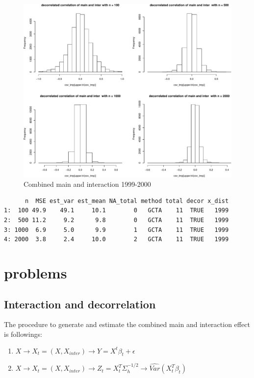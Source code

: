 \documentclass[]{article}
\providecommand{\tightlist}{%
  \setlength{\itemsep}{0pt}\setlength{\parskip}{0pt}}
\begin{document}
\begin{figure}
\centering
\includegraphics{PCBs_covariance_subsampling_files/figure-latex/unnamed-chunk-3-1.pdf}
\caption{Combined main and interaction 1999-2000}
\end{figure}

\begin{verbatim}
      n  MSE est_var est_mean NA_total method total decor x_dist
1:  100 49.9    49.1     10.1        0   GCTA    11  TRUE   1999
2:  500 11.2     9.2      9.8        0   GCTA    11  TRUE   1999
3: 1000  6.9     5.0      9.9        1   GCTA    11  TRUE   1999
4: 2000  3.8     2.4     10.0        2   GCTA    11  TRUE   1999
\end{verbatim}

\section{problems}\label{problems}

\subsection{Interaction and
decorrelation}\label{interaction-and-decorrelation}

The procedure to generate and estimate the combined main and interaction
effect is followings:

\begin{enumerate}
\def\labelenumi{\arabic{enumi}.}
\tightlist
\item
  \(X \rightarrow X_t = (X, X_{inter}) \rightarrow Y = X^t\beta_t + \epsilon\)
\item
  \(X \rightarrow X_t = (X, X_{inter}) \rightarrow Z_t = X_t^T \Sigma_h^{-1/2} \rightarrow \hat{Var}(X_t^T\beta_t)\)
\end{enumerate}
\end{document}
